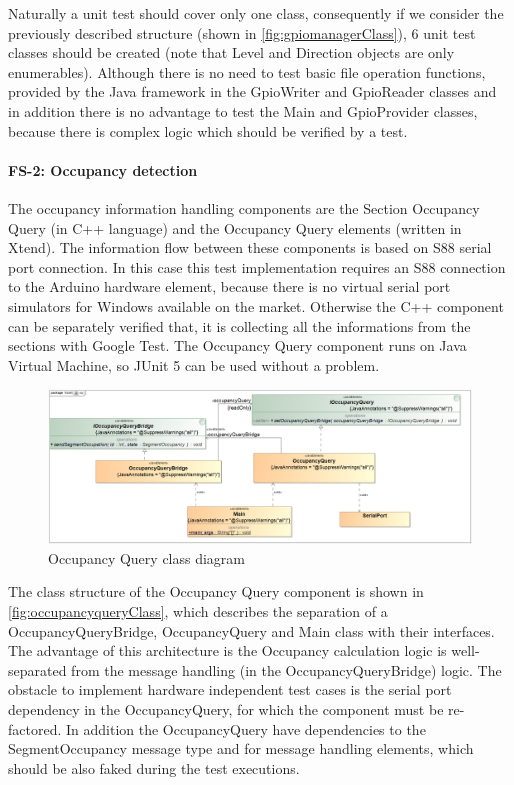 Naturally a unit test should cover only one class, consequently if we consider the previously described structure (shown in \autoref{fig:gpiomanagerClass}), 6 unit test classes should be created (note that Level and Direction objects are only enumerables). Although there is no need to test basic file operation functions, provided by the Java framework in the GpioWriter and GpioReader classes and in addition there is no advantage to test the Main and GpioProvider classes, because there is complex logic which should be verified by a test.


\paragraph{FS-2: Occupancy detection} The occupancy information handling components are the Section Occupancy Query (in C++ language) and the Occupancy Query elements (written in Xtend). The information flow between these components is based on S88 serial port connection. In this case this test implementation requires an S88 connection to the Arduino hardware element, because there is no virtual serial port simulators for Windows available on the market. Otherwise the C++ component can be separately verified that, it is collecting all the informations from the sections with Google Test. The Occupancy Query component runs on Java Virtual Machine, so JUnit 5 can be used without a problem. 

\begin{figure}[ht]
	\centering
	\includegraphics[width=150mm, keepaspectratio]{figures/impl/oq.png}
	\caption{Occupancy Query class diagram}
	\label{fig:occupancyqueryClass}
\end{figure}
The class structure of the Occupancy Query component is shown in \autoref{fig:occupancyqueryClass}, which describes the separation of a OccupancyQueryBridge, OccupancyQuery and Main class with their interfaces. The advantage of this architecture is the Occupancy calculation logic is well-separated from the message handling (in the OccupancyQueryBridge) logic. The obstacle to implement hardware independent test cases is the serial port dependency in the OccupancyQuery, for which the component must be re-factored. In addition the OccupancyQuery have dependencies to the SegmentOccupancy message type and for message handling elements, which should be also faked during the test executions.

